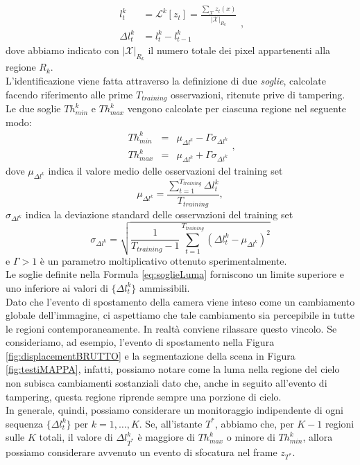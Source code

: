 \begin{equation}
	\label{eq:lumaRegions}
	\begin{array}{rl}
	l_t^k&  =  \mathcal{L}^k[z_t] = \frac{\sum_{\mathcal{X}} z_t(x) }{|\mathcal{X}|_{R_k}}\\
	\Delta l_t^k & = l_t^k-l_{t-1}^k 
	\end{array},
\end{equation}
dove abbiamo indicato con $|\mathcal{X}|_{R_k}$ il numero totale dei pixel appartenenti alla regione $R_k$.\\
L'identificazione viene fatta attraverso la definizione di due \textit{soglie}, calcolate facendo riferimento alle prime $T_{training}$ osservazioni, ritenute prive di tampering.
Le due soglie $Th_{min}^k$ e $Th_{max}^k$ vengono calcolate per ciascuna regione nel seguente modo:
\begin{equation}
\label{eq:soglieLuma}
\begin{array}{rcl}
Th_{min}^k & = & \mu_{\Delta l^k} -\Gamma \sigma_{\Delta l^k}\\
Th_{max}^k & = & \mu_{\Delta l^k} + \Gamma \sigma_{\Delta l^k}
\end{array},
\end{equation}
dove $\mu_{\Delta l^k}$ indica il valore medio delle osservazioni del training set
\begin{equation}
\mu_{\Delta l^k}  = \frac{\sum_{t = 1}^{T_{training}} \Delta l_t^k}{T_{training}}, \nonumber
\end{equation}
$\sigma_{\Delta l^k}$ indica la deviazione standard delle osservazioni del training set
\begin{equation}
\sigma_{\Delta l^k}  = \sqrt{\frac{1}{T_{training}-1}\sum_{t=1}^{T_{training}}\left(\Delta l_t^k - \mu_{\Delta l^k}\right)^2} \nonumber
\end{equation}
e $\Gamma>1$ \`e un parametro moltiplicativo ottenuto sperimentalmente.\\
Le soglie definite nella Formula \eqref{eq:soglieLuma} forniscono un limite superiore e uno inferiore ai valori di $\{\Delta l_t^k\}$ ammissibili.\\
Dato che l'evento di spostamento della camera viene inteso come un cambiamento globale dell'immagine, ci aspettiamo che tale cambiamento sia percepibile in tutte le regioni contemporaneamente. 
In realt\`a conviene rilassare questo vincolo.
Se consideriamo, ad  esempio, l'evento di spostamento nella Figura \ref{fig:displacementBRUTTO} e la segmentazione della scena in Figura \ref{fig:testiMAPPA}, infatti, possiamo notare come la luma nella regione del cielo non subisca cambiamenti sostanziali dato che, anche in seguito all'evento di tampering, questa regione riprende sempre una porzione di cielo.\\
In generale, quindi, possiamo considerare un monitoraggio indipendente di ogni sequenza $\{\Delta l_t^k\}$ per $k=1,\dots,K$.
Se, all'istante $T^*$, abbiamo che, per $K-1$ regioni sulle $K$ totali, il valore di $\Delta l_{T^*}^k$ \`e maggiore di $Th_{max}^k$ o minore di $Th_{min}^k$, allora possiamo considerare avvenuto un evento di sfocatura nel frame $z_{T^*}$. \\ 

